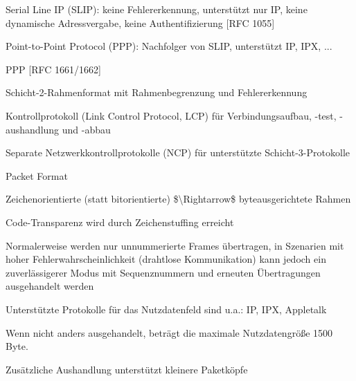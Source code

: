 \documentclass[a4paper]{article}
\begin{document}
\begin{multicols}{3}
\begin{itemize*}
            \begin{itemize*}
                  \item Serial Line IP (SLIP): keine Fehlererkennung, unterstützt nur IP, keine dynamische Adressvergabe, keine Authentifizierung {[}RFC 1055{]}
                  \item Point-to-Point Protocol (PPP): Nachfolger von SLIP, unterstützt IP, IPX, ...
            \end{itemize*}
            \item
            PPP {[}RFC 1661/1662{]}

            \begin{itemize*}
                  \item Schicht-2-Rahmenformat mit Rahmenbegrenzung und Fehlererkennung
                  \item Kontrollprotokoll (Link Control Protocol, LCP) für Verbindungsaufbau, -test, -aushandlung und -abbau
                  \item Separate Netzwerkkontrollprotokolle (NCP) für unterstützte Schicht-3-Protokolle
            \end{itemize*}
      \end{itemize*}

      Packet Format

      \begin{itemize*}
            \item
            Zeichenorientierte (statt bitorientierte)
            \$\textbackslash Rightarrow\$ byteausgerichtete Rahmen
            \item
            Code-Transparenz wird durch Zeichenstuffing erreicht
            \item
            Normalerweise werden nur unnummerierte Frames übertragen, in Szenarien
            mit hoher Fehlerwahrscheinlichkeit (drahtlose Kommunikation) kann
            jedoch ein zuverlässigerer Modus mit Sequenznummern und erneuten
            Übertragungen ausgehandelt werden
            \item
            Unterstützte Protokolle für das Nutzdatenfeld sind u.a.: IP, IPX,
            Appletalk
            \item
            Wenn nicht anders ausgehandelt, beträgt die maximale Nutzdatengröße
            1500 Byte.
            \item
            Zusätzliche Aushandlung unterstützt kleinere Paketköpfe
      \end{itemize*}


\end{multicols}
\end{document}
